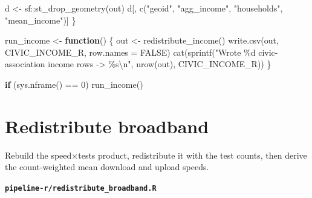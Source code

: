 \documentclass[
  letterpaper,
  DIV=11,
  numbers=noendperiod]{scrreprt}
\newenvironment{Shaded}{\begin{snugshade}}{\end{snugshade}}
\newcommand{\AttributeTok}[1]{\textcolor[rgb]{0.40,0.45,0.13}{#1}}
\newcommand{\ConstantTok}[1]{\textcolor[rgb]{0.56,0.35,0.01}{#1}}
\newcommand{\ControlFlowTok}[1]{\textcolor[rgb]{0.00,0.23,0.31}{\textbf{#1}}}
\newcommand{\DecValTok}[1]{\textcolor[rgb]{0.68,0.00,0.00}{#1}}
\newcommand{\FunctionTok}[1]{\textcolor[rgb]{0.28,0.35,0.67}{#1}}
\newcommand{\NormalTok}[1]{\textcolor[rgb]{0.00,0.23,0.31}{#1}}
\newcommand{\OtherTok}[1]{\textcolor[rgb]{0.00,0.23,0.31}{#1}}
\newcommand{\SpecialCharTok}[1]{\textcolor[rgb]{0.37,0.37,0.37}{#1}}
\newcommand{\StringTok}[1]{\textcolor[rgb]{0.13,0.47,0.30}{#1}}
\begin{document}
\begin{Shaded}
\begin{Highlighting}[]
\NormalTok{  d }\OtherTok{\textless{}{-}}\NormalTok{ sf}\SpecialCharTok{::}\FunctionTok{st\_drop\_geometry}\NormalTok{(out)}
\NormalTok{  d[, }\FunctionTok{c}\NormalTok{(}\StringTok{"geoid"}\NormalTok{, }\StringTok{"agg\_income"}\NormalTok{, }\StringTok{"households"}\NormalTok{, }\StringTok{"mean\_income"}\NormalTok{)]}
\NormalTok{\}}

\NormalTok{run\_income }\OtherTok{\textless{}{-}} \ControlFlowTok{function}\NormalTok{() \{}
\NormalTok{  out }\OtherTok{\textless{}{-}} \FunctionTok{redistribute\_income}\NormalTok{()}
  \FunctionTok{write.csv}\NormalTok{(out, CIVIC\_INCOME\_R, }\AttributeTok{row.names =} \ConstantTok{FALSE}\NormalTok{)}
  \FunctionTok{cat}\NormalTok{(}\FunctionTok{sprintf}\NormalTok{(}\StringTok{"Wrote \%d civic{-}association income rows {-}\textgreater{} \%s}\SpecialCharTok{\textbackslash{}n}\StringTok{"}\NormalTok{, }\FunctionTok{nrow}\NormalTok{(out), CIVIC\_INCOME\_R))}
\NormalTok{\}}

\ControlFlowTok{if}\NormalTok{ (}\FunctionTok{sys.nframe}\NormalTok{() }\SpecialCharTok{==} \DecValTok{0}\NormalTok{) }\FunctionTok{run\_income}\NormalTok{()}
\end{Highlighting}
\end{Shaded}

\section{Redistribute broadband}\label{redistribute-broadband-1}

Rebuild the speed×tests product, redistribute it with the test counts,
then derive the count-weighted mean download and upload speeds.

\textbf{\texttt{pipeline-r/redistribute\_broadband.R}}
\end{document}
